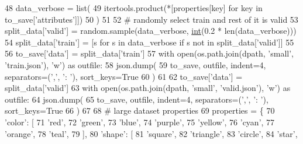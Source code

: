\begin{DoxyCode}
48         data\_verbose = list(
49             itertools.product(*[properties[key] \textcolor{keywordflow}{for} key \textcolor{keywordflow}{in} to\_save[\textcolor{stringliteral}{'attributes'}]])
50         )
51 
52         \textcolor{comment}{# randomly select train and rest of it is valid}
53         split\_data[\textcolor{stringliteral}{'valid'}] = random.sample(data\_verbose, \hyperlink{namespacelanguage__model_1_1eval__ppl_a7d12ee00479673c5c8d1f6d01faa272a}{int}(0.2 * len(data\_verbose)))
54         split\_data[\textcolor{stringliteral}{'train'}] = [s \textcolor{keywordflow}{for} s \textcolor{keywordflow}{in} data\_verbose \textcolor{keywordflow}{if} s \textcolor{keywordflow}{not} \textcolor{keywordflow}{in} split\_data[\textcolor{stringliteral}{'valid'}]]
55 
56         to\_save[\textcolor{stringliteral}{'data'}] = split\_data[\textcolor{stringliteral}{'train'}]
57         with open(os.path.join(dpath, \textcolor{stringliteral}{'small'}, \textcolor{stringliteral}{'train.json'}), \textcolor{stringliteral}{'w'}) \textcolor{keyword}{as} outfile:
58             json.dump(
59                 to\_save, outfile, indent=4, separators=(\textcolor{stringliteral}{','}, \textcolor{stringliteral}{': '}), sort\_keys=\textcolor{keyword}{True}
60             )
61 
62         to\_save[\textcolor{stringliteral}{'data'}] = split\_data[\textcolor{stringliteral}{'valid'}]
63         with open(os.path.join(dpath, \textcolor{stringliteral}{'small'}, \textcolor{stringliteral}{'valid.json'}), \textcolor{stringliteral}{'w'}) \textcolor{keyword}{as} outfile:
64             json.dump(
65                 to\_save, outfile, indent=4, separators=(\textcolor{stringliteral}{','}, \textcolor{stringliteral}{': '}), sort\_keys=\textcolor{keyword}{True}
66             )
67 
68         \textcolor{comment}{# large dataset properties}
69         properties = \{
70             \textcolor{stringliteral}{'color'}: [
71                 \textcolor{stringliteral}{'red'},
72                 \textcolor{stringliteral}{'green'},
73                 \textcolor{stringliteral}{'blue'},
74                 \textcolor{stringliteral}{'purple'},
75                 \textcolor{stringliteral}{'yellow'},
76                 \textcolor{stringliteral}{'cyan'},
77                 \textcolor{stringliteral}{'orange'},
78                 \textcolor{stringliteral}{'teal'},
79             ],
80             \textcolor{stringliteral}{'shape'}: [
81                 \textcolor{stringliteral}{'square'},
82                 \textcolor{stringliteral}{'triangle'},
83                 \textcolor{stringliteral}{'circle'},
84                 \textcolor{stringliteral}{'star'},

\end{DoxyCode}
